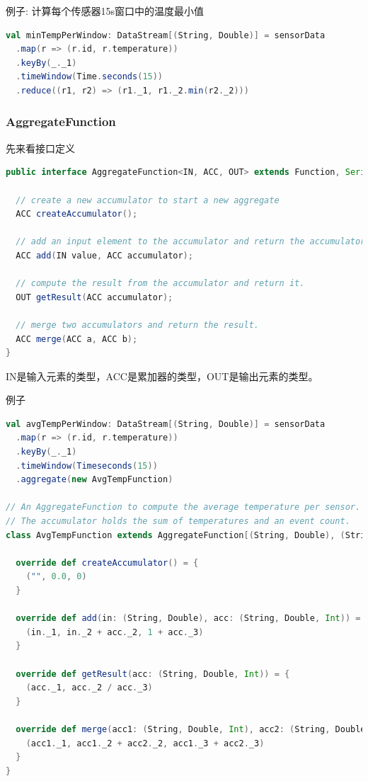 \documentclass[oneside]{ctexbook}
\begin{document}
例子: 计算每个传感器15s窗口中的温度最小值

\begin{lstlisting}[language=scala]
val minTempPerWindow: DataStream[(String, Double)] = sensorData
  .map(r => (r.id, r.temperature))
  .keyBy(_._1)
  .timeWindow(Time.seconds(15))
  .reduce((r1, r2) => (r1._1, r1._2.min(r2._2)))
\end{lstlisting}

\subsubsection{AggregateFunction}

先来看接口定义

\begin{lstlisting}[language=java]
public interface AggregateFunction<IN, ACC, OUT> extends Function, Serializable {

  // create a new accumulator to start a new aggregate
  ACC createAccumulator();

  // add an input element to the accumulator and return the accumulator
  ACC add(IN value, ACC accumulator);

  // compute the result from the accumulator and return it.
  OUT getResult(ACC accumulator);

  // merge two accumulators and return the result.
  ACC merge(ACC a, ACC b);
}
\end{lstlisting}

IN是输入元素的类型，ACC是累加器的类型，OUT是输出元素的类型。

例子

\begin{lstlisting}[language=scala]
val avgTempPerWindow: DataStream[(String, Double)] = sensorData
  .map(r => (r.id, r.temperature))
  .keyBy(_._1)
  .timeWindow(Timeseconds(15))
  .aggregate(new AvgTempFunction)

// An AggregateFunction to compute the average temperature per sensor.
// The accumulator holds the sum of temperatures and an event count.
class AvgTempFunction extends AggregateFunction[(String, Double), (String, Double, Int), (String, Double)] {

  override def createAccumulator() = {
    ("", 0.0, 0)
  }

  override def add(in: (String, Double), acc: (String, Double, Int)) = {
    (in._1, in._2 + acc._2, 1 + acc._3)
  }

  override def getResult(acc: (String, Double, Int)) = {
    (acc._1, acc._2 / acc._3)
  }

  override def merge(acc1: (String, Double, Int), acc2: (String, Double, Int)) = {
    (acc1._1, acc1._2 + acc2._2, acc1._3 + acc2._3)
  }
}
\end{lstlisting}
\end{document}
